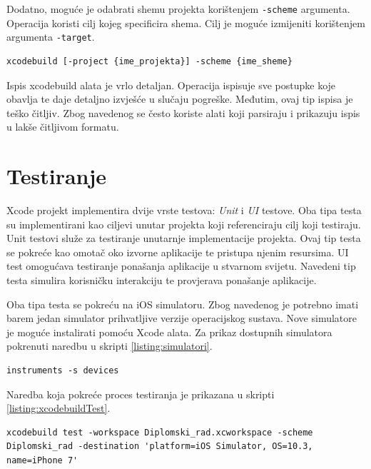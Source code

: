 \documentclass[times, utf8, diplomski, numeric]{fer}
\begin{document}
\begin{appendices}
Dodatno, moguće je odabrati shemu projekta korištenjem \verb|-scheme| argumenta. Operacija koristi cilj kojeg specificira shema. Cilj je moguće izmijeniti korištenjem argumenta \verb|-target|.

\begin{lstlisting}[caption=Odabir sheme projekta]
xcodebuild [-project {ime_projekta}] -scheme {ime_sheme}
\end{lstlisting}

Ispis xcodebuild alata je vrlo detaljan. Operacija ispisuje sve postupke koje obavlja te daje detaljno izvješće u slučaju pogreške. Međutim, ovaj tip ispisa je teško čitljiv. Zbog navedenog se često koriste alati koji parsiraju i prikazuju ispis u lakše čitljivom formatu.

\section{Testiranje} \label{TestiranjeXcodeBuild}

Xcode projekt implementira dvije vrste testova: \textit{Unit} i \textit{UI} testove. Oba tipa testa su implementirani kao ciljevi unutar projekta koji referenciraju cilj koji testiraju. Unit testovi služe za testiranje unutarnje implementacije projekta. Ovaj tip testa se pokreće kao omotač oko izvorne aplikacije te pristupa njenim resursima. UI test omogućava testiranje ponašanja aplikacije u stvarnom svijetu. Navedeni tip testa simulira korisničku interakciju te provjerava ponašanje aplikacije.

Oba tipa testa se pokreću na iOS simulatoru. Zbog navedenog je potrebno imati barem jedan simulator prihvatljive verzije operacijskog sustava. Nove simulatore je moguće instalirati pomoću Xcode alata. Za prikaz dostupnih simulatora pokrenuti naredbu u skripti \ref{listing:simulatori}.

\begin{lstlisting}[caption=Ispis dostupnih simulatora, label=listing:simulatori]
instruments -s devices
\end{lstlisting}

Naredba koja pokreće proces testiranja je prikazana u skripti \ref{listing:xcodebuildTest}.

\begin{lstlisting}[caption=Pokretanje testne operaije korištenjem xcodebuild alata, label=listing:xcodebuildTest]
xcodebuild test -workspace Diplomski_rad.xcworkspace -scheme Diplomski_rad -destination 'platform=iOS Simulator, OS=10.3, name=iPhone 7'
\end{lstlisting}


\end{appendices}
\end{document}
